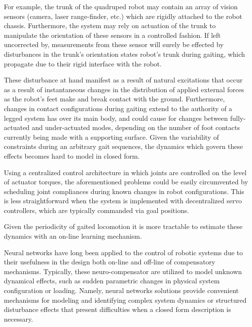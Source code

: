 For example, the trunk of the quadruped robot may contain an array of vision sensors (camera, laser range-finder, etc.)
which are rigidly attached to the robot chassis. Furthermore, the system may rely on actuation of the trunk to manipulate
the orientation of these sensors in a controlled fashion. If left uncorrected by, measurements from these 
sensor will surely be effected by disturbances in the trunk's orientation states robot's trunk during gaiting, which propagate
due to their rigid interface with the robot.

These disturbance at hand manifest as a result of natural excitations that occur as a result of instantaneous changes 
in the distribution of applied external forces as the robot's feet make and break contact with the ground.
Furthermore, changes in contact configurations during gaiting extend to the authority of a legged system has over 
its main body, and could cause for changes between fully-actuated and under-actuated modes, depending on the 
number of foot contacts currently being made with a supporting surface. Given the variability of constraints during 
an arbitrary gait sequences, the dynamics which govern these effects becomes hard to model in closed form.

Using a centralized control architecture in which joints are controlled on the level of actuator torques, 
the aforementioned problems could be easily circumvented by scheduling joint compliances during 
known changes in robot configurations. This is less straightforward when the system is implemented
with decentralized servo controllers, which are typically commanded via goal positions.

Given the periodicity of gaited locomotion it is more tractable to estimate these dynamics with an on-line learning mechanism.

Neural networks have long been applied to the control of robotic systems due to their usefulness
in the design both on-line and off-line of compensatory mechanisms. Typically, these neuro-compensator
are utilized to model unknown dynamical effects, such as sudden parametric changes in physical system
configuration or loading. Namely, neural networks solutions provide convenient mechanisms for modeling and 
identifying complex system dynamics or structured disturbance effects that present difficulties when a 
closed form description is necessary. 





